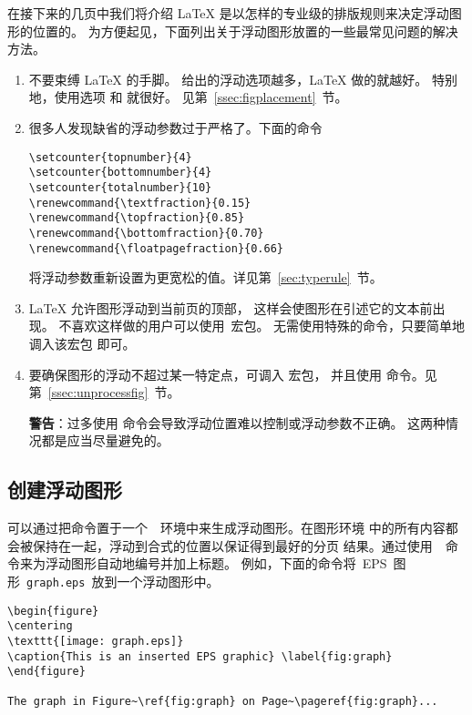 在接下来的几页中我们将介绍 \LaTeX{} 是以怎样的专业级的排版规则来决定浮动图形的位置的。
为方便起见，下面列出关于浮动图形放置的一些最常见问题的解决方法。
\begin{enumerate}
	\item 不要束缚 \LaTeX{} 的手脚。
	给出的浮动选项越多，\LaTeX{} 做的就越好。
	特别地，使用选项 \opt{[htbp]} 和 \opt{[tbp]}	就很好。
	见第~\ref{ssec:figplacement}~节。
	
	\item 很多人发现缺省的浮动参数过于严格了。下面的命令
\begin{lstlisting}
\setcounter{topnumber}{4}
\setcounter{bottomnumber}{4}
\setcounter{totalnumber}{10}
\renewcommand{\textfraction}{0.15}
\renewcommand{\topfraction}{0.85}
\renewcommand{\bottomfraction}{0.70}
\renewcommand{\floatpagefraction}{0.66}
\end{lstlisting}
	将浮动参数重新设置为更宽松的值。详见第~\ref{sec:typerule}~节。
	
	\item \LaTeX{} 允许图形浮动到当前页的顶部，
	这样会使图形在引述它的文本前出现。
	不喜欢这样做的用户可以使用~宏包。
	无需使用特殊的命令，只要简单地调入该宏包  即可。
	
	\item 要确保图形的浮动不超过某一特定点，可调入  宏包，
	并且使用  命令。见第~\ref{ssec:unprocessfig}~节。
	
	\textbf{警告}：过多使用 	命令会导致浮动位置难以控制或浮动参数不正确。
	这两种情况都是应当尽量避免的。
\end{enumerate}


\subsection{创建浮动图形}

可以通过把命令置于一个~~环境中来生成浮动图形。在图形环境
中的所有内容都会被保持在一起，浮动到合式的位置以保证得到最好的分页
结果。通过使用~~命令来为浮动图形自动地编号并加上标题。
例如，下面的命令将~EPS~图形~\texttt{graph.eps}~放到一个浮动图形中。
\begin{Verbatim}[xleftmargin=1cm]
\begin{figure} 
\centering 
\texttt{[image: graph.eps]} 
\caption{This is an inserted EPS graphic} \label{fig:graph} 
\end{figure}

The graph in Figure~\ref{fig:graph} on Page~\pageref{fig:graph}...
\end{Verbatim}

